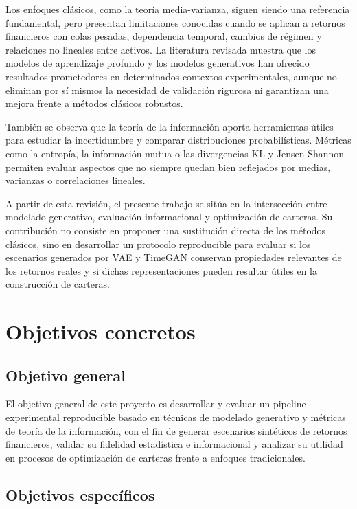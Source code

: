 \documentclass[11pt,a4paper,spanish,oneside]{book}
\numberwithin{equation}{chapter}
\numberwithin{figure}{chapter}
\begin{document}
Los enfoques clásicos, como la teoría media-varianza, siguen siendo una referencia fundamental, pero presentan limitaciones conocidas cuando se aplican a retornos financieros con colas pesadas, dependencia temporal, cambios de régimen y relaciones no lineales entre activos. La literatura revisada muestra que los modelos de aprendizaje profundo y los modelos generativos han ofrecido resultados prometedores en determinados contextos experimentales, aunque no eliminan por sí mismos la necesidad de validación rigurosa ni garantizan una mejora frente a métodos clásicos robustos.

También se observa que la teoría de la información aporta herramientas útiles para estudiar la incertidumbre y comparar distribuciones probabilísticas. Métricas como la entropía, la información mutua o las divergencias KL y Jensen-Shannon permiten evaluar aspectos que no siempre quedan bien reflejados por medias, varianzas o correlaciones lineales.

A partir de esta revisión, el presente trabajo se sitúa en la intersección entre modelado generativo, evaluación informacional y optimización de carteras. Su contribución no consiste en proponer una sustitución directa de los métodos clásicos, sino en desarrollar un protocolo reproducible para evaluar si los escenarios generados por VAE y TimeGAN conservan propiedades relevantes de los retornos reales y si dichas representaciones pueden resultar útiles en la construcción de carteras.

\chapter{Objetivos concretos}
\section{Objetivo general}

El objetivo general de este proyecto es desarrollar y evaluar un pipeline experimental reproducible basado en técnicas de modelado generativo y métricas de teoría de la información, con el fin de generar escenarios sintéticos de retornos financieros, validar su fidelidad estadística e informacional y analizar su utilidad en procesos de optimización de carteras frente a enfoques tradicionales.

\section{Objetivos específicos}
\end{document}
